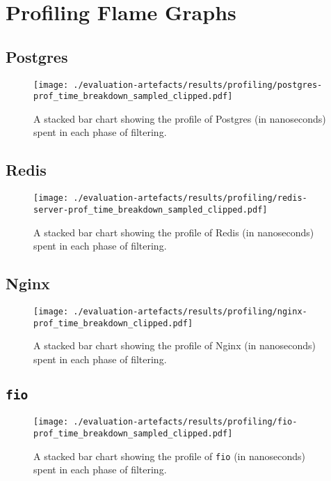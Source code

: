 \section{Profiling Flame Graphs}\label{apx:flame-graphs}

\subsection{Postgres}
\begin{figure}[H]
    \centering
    \texttt{[image: ./evaluation-artefacts/results/profiling/postgres-prof\_time\_breakdown\_sampled\_clipped.pdf]}
    \caption{A stacked bar chart showing the profile of Postgres (in nanoseconds) \af
    spent in each phase of filtering.}
    \label{fig:postgres-profile}
\end{figure}


\subsection{Redis}
\begin{figure}[H]
    \centering
    \texttt{[image: ./evaluation-artefacts/results/profiling/redis-server-prof\_time\_breakdown\_sampled\_clipped.pdf]}
    \caption{A stacked bar chart showing the profile of Redis (in nanoseconds) \af
    spent in each phase of filtering.}
    \label{fig:redis-profile}
\end{figure}


\subsection{Nginx}
\begin{figure}[H]
    \centering
    \texttt{[image: ./evaluation-artefacts/results/profiling/nginx-prof\_time\_breakdown\_clipped.pdf]}
    \caption{A stacked bar chart showing the profile of Nginx (in nanoseconds) \af
    spent in each phase of filtering.}
    \label{fig:nginx-profile}
\end{figure}

\subsection{\texttt{fio}}
\begin{figure}[H]
    \centering
    \texttt{[image: ./evaluation-artefacts/results/profiling/fio-prof\_time\_breakdown\_sampled\_clipped.pdf]}
    \caption{A stacked bar chart showing the profile of \texttt{fio} (in nanoseconds) \af
    spent in each phase of filtering.}
    \label{fig:fio-profile}
\end{figure}


